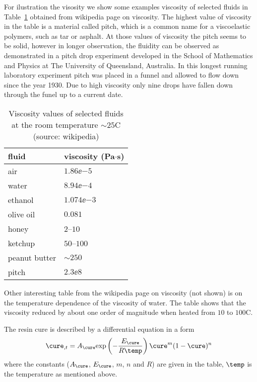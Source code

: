 \documentclass[twoside,a4paper,12pt,draft]{article}
\newcommand{\tabref}[1]{Table~\ref{#1}}
\begin{document}
For ilustration the visosity we show some examples viscosity of
selected fluids in \tabref{tab:viscos-example} obtained from wikipedia
page on viscosity. The highest value of viscosity in the table is a
material called pitch, which is a common name for a viscoelastic
polymers, such as tar or asphalt. At those values of viscosity the
pitch seems to be solid, however in longer observation, the fluidity
can be observed as demonstrated in a pitch drop experiment developed
in the School of Mathematics and Physics at The University of
Queensland, Australia. In this longest running laboratory experiment
pitch was placed in a funnel and allowed to flow down since the year
1930. Due to high viscosity only nine drops have fallen down through
the funel up to a current date.

\begin{table}
  \centering
  \begin{tabular}{ll}
    \toprule
    fluid         & viscosity (Pa$\cdot$s) \\
    \midrule
    air           & $1.86\ee{-5}$          \\
    water         & $8.94\ee{-4}$          \\
    ethanol       & $1.074\ee{-3}$         \\ 
    olive oil     & $0.081$                \\
    honey         & $2$--$10$              \\
    ketchup       & $50$--$100$            \\
    peanut butter & $\sim 250$             \\
    pitch         & $2.3\ee{8}$            \\
    \bottomrule
  \end{tabular}
  \caption{Viscosity values of selected fluids at the room temperature $\sim 25$\degree C (source: wikipedia)}
  \label{tab:viscos-example}
\end{table}

Other interesting table from the wikipedia page on viscosity (not
shown) is on the temperature dependence of the viscosity of water. The
table shows that the viscosity reduced by about one order of magnitude
when heated from $10$ to $100$\degree C.  


The resin cure is described by a differential equation in a form
%
\begin{align}
  \cure_{,t} =  A_\cure \exp{-\frac{E_\cure }{R\temp}} \cure^m (1-\cure)^n \label{eq:cure}
\end{align}
%
where the constants ($A_\cure$, $E_\cure$, $m$, $n$ and $R$) are
given in the table, $\temp$ is the temperature as mentioned above.
\end{document}
